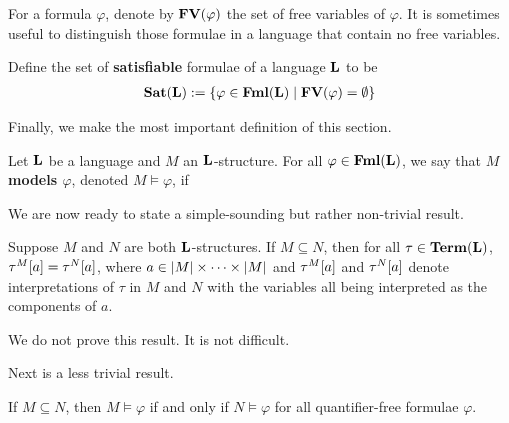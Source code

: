 For a formula $\varphi$, denote by $\mathbf{FV}\!\left( \varphi \right)$ the set of free variables of $\varphi$. It is sometimes useful to distinguish those formulae in a language that contain no free variables.

\begin{boxdefinition}
    Define the set of \textbf{satisfiable} formulae of a language $\mathbf{L}$ to be
    \begin{align*}
        \mathbf{Sat}\!\left( \mathbf{L} \right) := \left\{ \varphi \in \mathbf{Fml}\!\left( \mathbf{L} \right) \; \middle\vert \; \mathbf{FV}\!\left( \varphi \right) = \emptyset \right\}
    \end{align*}
\end{boxdefinition}

Finally, we make the most important definition of this section.

\begin{boxdefinition}[Satisfaction]
    Let $\mathbf{L}$ be a language and $M$ an $\mathbf{L}$-structure. For all $\varphi \in \mathbf{Fml}\!\left( \mathbf{L} \right)$, we say that \textbf{$M$ models $\varphi$}, denoted $M \models \varphi$, if \sorry %
\end{boxdefinition}

We are now ready to state a simple-sounding but rather non-trivial result.

\begin{boxlemma}
    Suppose $M$ and $N$ are both $\mathbf{L}$-structures. If $M \subseteq N$, then for all $\tau \in \mathbf{Term}\!\left( \mathbf{L} \right)$, $\tau^{M}\!\left[ a \right] = \tau^N\!\left[ a \right]$, where $a \in \left\lvert M \right\rvert \times \cdots \times \left\lvert M \right\rvert$ and $\tau^M\!\left[ a \right]$ and $\tau^N\!\left[ a \right]$ denote interpretations of $\tau$ in $M$ and $N$ with the variables all being interpreted as the components of $a$.
\end{boxlemma}

We do not prove this result. It is not difficult.

Next is a less trivial result.

\begin{boxlemma}
    If $M \subseteq N$, then $M \models \varphi$ if and only if $N \models \varphi$ for all quantifier-free formulae $\varphi$.
\end{boxlemma}